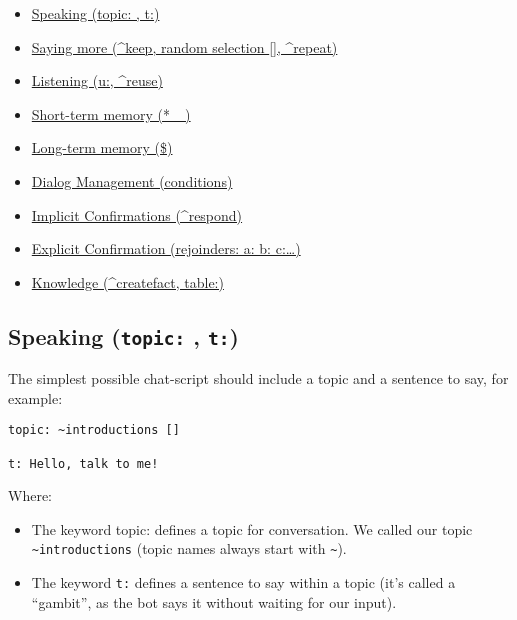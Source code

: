 \documentclass[]{article}
\providecommand{\tightlist}{%
  \setlength{\itemsep}{0pt}\setlength{\parskip}{0pt}}
\begin{document}
\begin{itemize}
\tightlist
\item
  \href{ChatScript-Tutorial-md\#speaking-topic--t}{Speaking (topic: ,
  t:)}
\item
  \href{ChatScript-Tutorial.md\#saying-more-keep-random-selection--repeat}{Saying
  more (\^{}keep, random selection {[}{]}, \^{}repeat)}
\item
  \href{ChatScript-Tutorial.md\#listening-u-reuse}{Listening (u:,
  \^{}reuse)}
\item
  \href{ChatScript-Tutorial.md\#short-term-memory--_}{Short-term memory
  (* \_)}
\item
  \href{ChatScript-Tutorial.md\#long-term-memory-}{Long-term memory
  (\$)}
\item
  \href{ChatScript-Tutorial.md\#dialog-management-conditions}{Dialog
  Management (conditions)}
\item
  \href{ChatScript-Tutorial.md\#implicit-confirmations-respond}{Implicit
  Confirmations (\^{}respond)}
\item
  \href{ChatScript-Tutorial.md\#explicit-confirmation-rejoinders-a-b-c-}{Explicit
  Confirmation (rejoinders: a: b: c:\ldots{})}
\item
  \href{ChatScript-Tutorial.md\#knowledge-createfact-table}{Knowledge
  (\^{}createfact, table:)}
\end{itemize}

\subsection{\texorpdfstring{Speaking (\texttt{topic:} ,
\texttt{t:})}{Speaking (topic: , t:)}}\label{speaking-topic-t}

The simplest possible chat-script should include a topic and a sentence
to say, for example:

\begin{verbatim}
topic: ~introductions []

t: Hello, talk to me!
\end{verbatim}

Where:

\begin{itemize}
\item
  The keyword topic: defines a topic for conversation. We called our
  topic \texttt{\textasciitilde{}introductions} (topic names always
  start with \texttt{\textasciitilde{}}).
\item
  The keyword \texttt{t:} defines a sentence to say within a topic (it's
  called a ``gambit'', as the bot says it without waiting for our
  input).
\end{itemize}
\end{document}
